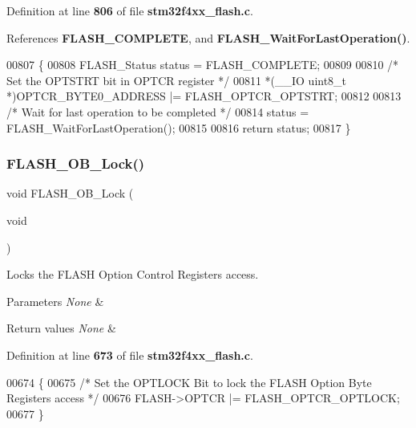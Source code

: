 Definition at line \textbf{ 806} of file \textbf{ stm32f4xx\+\_\+flash.\+c}.



References \textbf{ F\+L\+A\+S\+H\+\_\+\+C\+O\+M\+P\+L\+E\+TE}, and \textbf{ F\+L\+A\+S\+H\+\_\+\+Wait\+For\+Last\+Operation()}.


\begin{DoxyCode}
00807 \{
00808   FLASH_Status status = FLASH_COMPLETE;
00809 
00810   \textcolor{comment}{/* Set the OPTSTRT bit in OPTCR register */}
00811   *(\_\_IO uint8\_t *)OPTCR_BYTE0_ADDRESS |= FLASH_OPTCR_OPTSTRT;
00812 
00813   \textcolor{comment}{/* Wait for last operation to be completed */}
00814   status = FLASH_WaitForLastOperation();
00815 
00816   \textcolor{keywordflow}{return} status;
00817 \}
\end{DoxyCode}
\mbox{\label{group__FLASH__Group3_ga63a33d9af7e29b64c3806e5505c59b74}} 
\subsubsection{F\+L\+A\+S\+H\+\_\+\+O\+B\+\_\+\+Lock()}
{\footnotesize\ttfamily void F\+L\+A\+S\+H\+\_\+\+O\+B\+\_\+\+Lock (\begin{DoxyParamCaption}\item[{void}]{ }\end{DoxyParamCaption})}



Locks the F\+L\+A\+SH Option Control Registers access. 


\begin{DoxyParams}{Parameters}
{\em None} & \\
\hline
\end{DoxyParams}

\begin{DoxyRetVals}{Return values}
{\em None} & \\
\hline
\end{DoxyRetVals}


Definition at line \textbf{ 673} of file \textbf{ stm32f4xx\+\_\+flash.\+c}.


\begin{DoxyCode}
00674 \{
00675   \textcolor{comment}{/* Set the OPTLOCK Bit to lock the FLASH Option Byte Registers access */}
00676   FLASH->OPTCR |= FLASH_OPTCR_OPTLOCK;
00677 \}
\end{DoxyCode}
\mbox{\label{group__FLASH__Group3_ga12cb6799f725a49cd151eef4d6d1789b}} 
